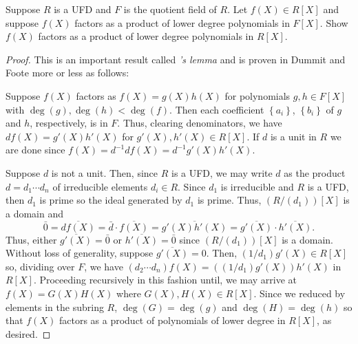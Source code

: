 \begin{problem}
Suppose $R$ is a UFD and $F$ is the quotient field of $R$. Let $f(X)\in
R[X]$ and suppose $f(X)$ factors as a product of lower degree polynomials
in $F[X]$. Show $f(X)$ factors as a product of lower degree polynomials in
$R[X]$.
\end{problem}
\begin{proof}
This is an important result called \emph{'s lemma} and is proven in
Dummit and Foote more or less as follows:

Suppose $f(X)$ factors as $f(X)=g(X)h(X)$ for polynomials $g,h\in F[X]$
with $\deg(g),\deg(h)<\deg(f)$. Then each coefficient $\left\{a_i\right\}$,
$\left\{b_i\right\}$ of $g$ and $h$, respectively, is in $F$. Thus,
clearing denominators, we have $df(X)=g'(X)h'(X)$ for $g'(X),h'(X)\in
R[X]$. If $d$ is a unit in $R$ we are done since
$f(X)=d^{-1}df(X)=d^{-1}g'(X)h'(X)$.

Suppose $d$ is not a unit. Then, since $R$ is a UFD, we may write $d$ as
the product $d=d_1\cdots d_n$ of irreducible elements $d_i\in R$. Since
$d_1$ is irreducible and $R$ is a UFD, then $d_1$ is prime so the ideal
generated by $d_1$ is prime. Thus, $\left(R/(d_1)\right)[X]$ is a domain
and
\[
\bar 0=\overline{df(X)}=
{\bar d}\cdot \overline{f(X)}=\overline{g'(X)h'(X)}=
\overline{g'(X)}\cdot\overline{h'(X)}.
\]
Thus, either $\overline{g'(X)}=\bar 0$ or $\overline{h'(X)}=\bar 0$ since
$\left(R/(d_1)\right)[X]$ is a domain. Without loss of generality, suppose
$\overline{g'(X)}=0$. Then, $(1/d_1)g'(X)\in R[X]$ so, dividing over
$F$, we have $(d_2\cdots d_n)f(X)=\left((1/d_1)g'(X)\right)h'(X)$ in
$R[X]$. Proceeding recursively in this fashion until, we may arrive at
$f(X)=G(X)H(X)$ where $G(X),H(X)\in R[X]$. Since we reduced by elements in
the subring $R$, $\deg(G)=\deg(g)$ and $\deg(H)=\deg(h)$ so that $f(X)$
factors as a product of polynomials of lower degree in $R[X]$, as desired.
\end{proof}

